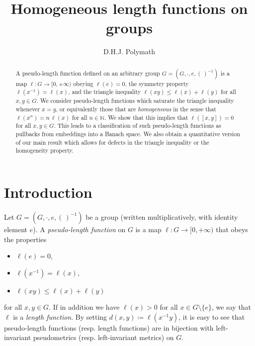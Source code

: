 \documentclass[11pt,a4paper,reqno]{amsart}
\numberwithin{equation}{section}
\theoremstyle{plain}
\theoremstyle{definition}
\newcommand\N{\mathbb{N}}
\newcommand\normsymb{\ell}  %
\newcommand\norm[1]{\ell({#1})}   %
\begin{document}
\title{Homogeneous length functions on groups}

\author{D.H.J. Polymath}
\address{\url{http://michaelnielsen.org/polymath1/index.php}}

\begin{abstract}
A pseudo-length function defined on an arbitrary group $G = (G,\cdot,e,
(\,)^{-1})$ is a map $\normsymb: G \to [0,+\infty)$ obeying $\norm{e}=0$,
the symmetry property $\norm{x^{-1}} = \norm{x}$, and the triangle
inequality $\norm{xy} \leq \norm{x} + \norm{y}$ for all $x,y \in G$. We
consider pseudo-length functions which saturate the triangle inequality
whenever $x=y$, or equivalently those that are \emph{homogeneous} in the
sense that $\norm{x^n} = n\,\norm{x}$ for all $n\in\N$. We show that this
implies that $\norm{[x,y]}=0$ for all $x,y \in G$. This leads to a
classification of such pseudo-length functions as pullbacks from
embeddings into a Banach space.  We also obtain a quantitative version of
our main result which allows for defects in the triangle inequality or
the homogeneity property.
\end{abstract}



\maketitle


\section{Introduction}

Let $G = (G, \cdot, e, (\,)^{-1})$ be a group (written multiplicatively,
with identity element $e$).  A \emph{pseudo-length function} on $G$ is a
map $\normsymb : G \to [0,+\infty)$ that obeys the properties
\begin{itemize}
\item $\norm{e} = 0$,
\item $\norm{ x^{-1} } = \norm{x}$,
\item $\norm{ x y } \leq \norm{x} + \norm{ y }$
\end{itemize}
for all $x,y\in G$.  If in addition we have $\norm{x}>0$ for all $x \in G
\setminus \{e\}$, we say that $\normsymb$ is a \emph{length function}. By
setting $d(x,y) \coloneqq \norm{x^{-1}y}$, it is easy to see that
pseudo-length functions (resp. length functions) are in bijection with
left-invariant pseudometrics (resp. left-invariant metrics) on $G$.
\end{document}
